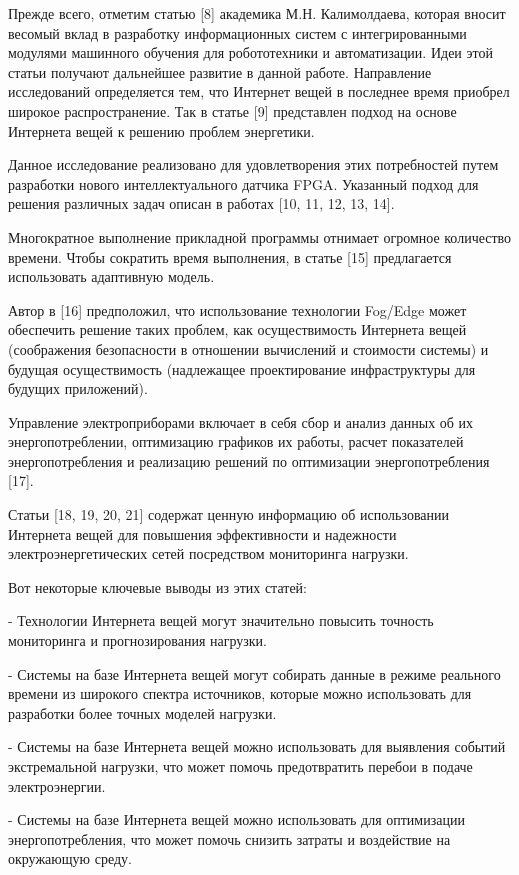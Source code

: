 Прежде всего, отметим статью {[}8{]} академика М.Н. Калимолдаева,
которая вносит весомый вклад в разработку информационных систем с
интегрированными модулями машинного обучения для робототехники и
автоматизации. Идеи этой статьи получают дальнейшее развитие в данной
работе. Направление исследований определяется тем, что Интернет вещей в
последнее время приобрел широкое распространение. Так в статье {[}9{]}
представлен подход на основе Интернета вещей к решению проблем
энергетики.

Данное исследование реализовано для удовлетворения этих потребностей
путем разработки нового интеллектуального датчика FPGA. Указанный подход
для решения различных задач описан в работах {[}10, 11, 12, 13, 14{]}.

Многократное выполнение прикладной программы отнимает огромное
количество времени. Чтобы сократить время выполнения, в статье {[}15{]}
предлагается использовать адаптивную модель.

Автор в {[}16{]} предположил, что использование технологии Fog/Edge
может обеспечить решение таких проблем, как осуществимость Интернета
вещей (соображения безопасности в отношении вычислений и стоимости
системы) и будущая осуществимость (надлежащее проектирование
инфраструктуры для будущих приложений).

Управление электроприборами включает в себя сбор и анализ данных об их
энергопотреблении, оптимизацию графиков их работы, расчет показателей
энергопотребления и реализацию решений по оптимизации энергопотребления
{[}17{]}.

Статьи {[}18, 19, 20, 21{]} содержат ценную информацию об использовании
Интернета вещей для повышения эффективности и надежности
электроэнергетических сетей посредством мониторинга нагрузки.

Вот некоторые ключевые выводы из этих статей:

- Технологии Интернета вещей могут значительно повысить точность
мониторинга и прогнозирования нагрузки.

- Системы на базе Интернета вещей могут собирать данные в режиме
реального времени из широкого спектра источников, которые можно
использовать для разработки более точных моделей нагрузки.

- Системы на базе Интернета вещей можно использовать для выявления
событий экстремальной нагрузки, что может помочь предотвратить перебои в
подаче электроэнергии.

- Системы на базе Интернета вещей можно использовать для оптимизации
энергопотребления, что может помочь снизить затраты и воздействие на
окружающую среду.

